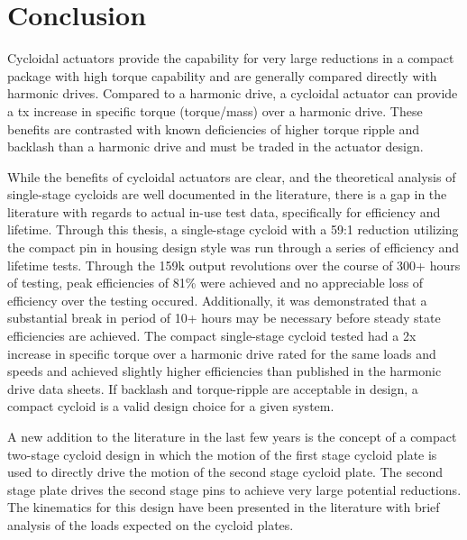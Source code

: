 
\chapter{Conclusion}\label{ch:conclusion}

Cycloidal actuators provide the capability for very large reductions in a compact package with high torque capability and are generally compared directly with harmonic drives. Compared to a harmonic drive, a cycloidal actuator can provide a tx increase in specific torque (torque/mass) over a harmonic drive. These benefits are contrasted with known deficiencies of higher torque ripple and backlash than a harmonic drive and must be traded in the actuator design. 

While the benefits of cycloidal actuators are clear, and the theoretical analysis of single-stage cycloids are well documented in the literature, there is a gap in the literature with regards to actual in-use test data, specifically for efficiency and lifetime. Through this thesis, a single-stage cycloid with a 59:1 reduction utilizing the compact pin in housing design style was run through a series of efficiency and lifetime tests. Through the 159k output revolutions over the course of 300+ hours of testing, peak efficiencies of 81\% were achieved and no appreciable loss of efficiency over the testing occured. Additionally, it was demonstrated that a substantial break in period of 10+ hours may be necessary before steady state efficiencies are achieved. The compact single-stage cycloid tested had a 2x increase in specific torque over a harmonic drive rated for the same loads and speeds and achieved slightly higher efficiencies than published in the harmonic drive data sheets. If backlash and torque-ripple are acceptable in design, a compact cycloid is a valid design choice for a given system. 

A new addition to the literature in the last few years is the concept of a compact two-stage cycloid design in which the motion of the first stage cycloid plate is used to directly drive the motion of the second stage cycloid plate. The second stage plate drives the second stage pins to achieve very large potential reductions. The kinematics for this design have been presented in the literature with brief analysis of the loads expected on the cycloid plates. 

